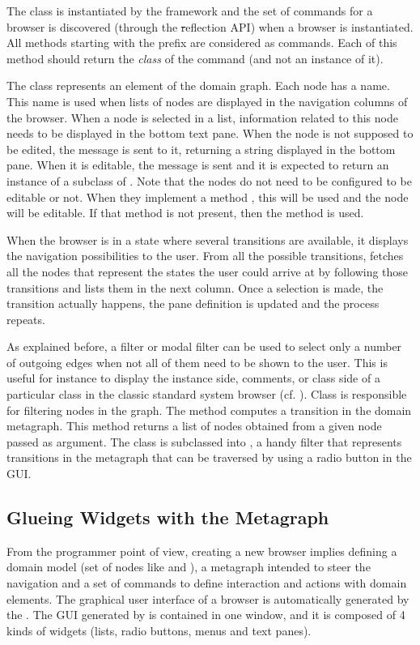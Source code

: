 \documentclass[a4paper,10pt,twoside]{book}
\begin{document}
The class  is instantiated by the framework and the set of commands for a browser is discovered (through the \st reflection API) when a browser is instantiated. All methods starting with the  prefix are considered as commands. Each of this method should return the \emph{class} of the command (and not an instance of it).

The class  represents an element of the domain graph. Each node has a name. This name is used when lists of nodes are displayed in the navigation columns of the browser. When a node is selected in a list, information related to this node needs to be displayed in the bottom text pane. 
When the node is not supposed to be edited, the message  is sent to it, returning a string  displayed in the bottom pane. When it is editable, the message  is sent and it is expected to return an instance of a subclass of . Note that the nodes do not need to be configured to be editable or not. When they implement a method , this will be used and the node will be editable. If that method is not present, then the method  is used. 

When the browser is in a state where several transitions are available, it displays the navigation possibilities to the user. From all the possible transitions, \obf fetches all the nodes that represent the states the user could arrive at by following those transitions and lists them in the next column. Once a selection is made, the transition  actually happens, the pane definition is updated and the process repeats.

As explained before, a filter or modal filter can be used to select only a number of outgoing edges when not all of them need to be shown to the user. This is useful for instance to display the instance side, comments, or class side of a particular class in the classic standard system browser (cf. ). Class  is responsible for filtering nodes in the graph. The method  computes a transition in the domain metagraph. This method returns a list of nodes obtained from a given node passed as argument. The class  is subclassed into , a handy filter that represents transitions in the metagraph that can be traversed by using a radio button in the GUI.


\subsection{Glueing Widgets with the Metagraph}\label{widgets}
From the programmer point of view, creating a new browser implies defining a domain model (set of nodes like  and ), a metagraph intended to steer the navigation and a set of commands to define interaction and actions with domain elements. The graphical user interface of a browser is automatically generated by the \obf. The GUI generated by \obf is contained in one window, and it is composed of 4 kinds of widgets (lists, radio buttons, menus and text panes).
\end{document}
